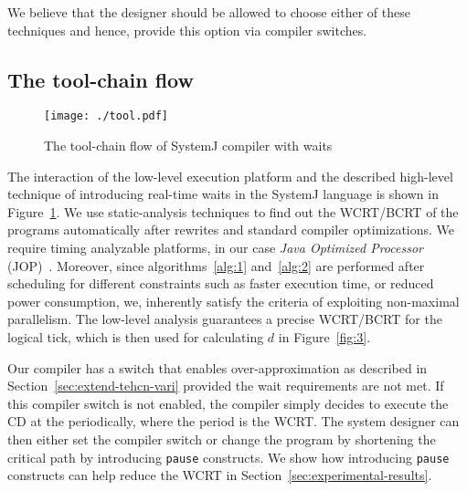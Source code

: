We believe that the designer should be allowed to choose either of these
techniques and hence, provide this option via compiler switches.

\subsection{The tool-chain flow}
\label{sec:tool-chain-flow}

\begin{figure}[h!]
  \centering
  \texttt{[image: ./tool.pdf]}
  \caption{The tool-chain flow of SystemJ compiler with waits}
  \label{fig:4}
\end{figure}

The interaction of the low-level execution platform and the described
high-level technique of introducing real-time waits in the SystemJ
language is shown in Figure~\ref{fig:4}. We use static-analysis
techniques to find out the WCRT/BCRT of the programs automatically after
rewrites and standard compiler optimizations. We require timing
analyzable platforms, in our case \textit{Java Optimized Processor}
(JOP)~\cite{jop:jnl:jsa2007}. Moreover, since algorithms~\ref{alg:1}
and~\ref{alg:2} are performed after scheduling for different constraints
such as faster execution time, or reduced power consumption, we,
inherently satisfy the criteria of exploiting non-maximal
parallelism. The low-level analysis guarantees a precise WCRT/BCRT for
the logical tick, which is then used for calculating $d$ in
Figure~\ref{fig:3}.

Our compiler has a switch that enables over-approximation as described
in Section~\ref{sec:extend-tehcn-vari} provided the wait requirements
are not met. If this compiler switch is not enabled, the compiler simply
decides to execute the CD at the periodically, where the period is the
WCRT. The system designer can then either set the compiler switch or
change the program by shortening the critical path by introducing
\texttt{pause} constructs. We show how introducing \texttt{pause}
constructs can help reduce the WCRT in
Section~\ref{sec:experimental-results}.


